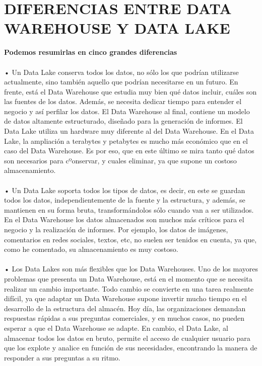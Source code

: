 \section{DIFERENCIAS ENTRE DATA WAREHOUSE Y DATA LAKE}
\item{
\textbf{Podemos resumirlas en cinco grandes diferencias}\\\\
•	Un Data Lake conserva todos los datos, no sólo los que podrían utilizarse actualmente, sino también aquello que podrían necesitarse en un futuro. En frente, está el Data Warehouse que estudia muy bien qué datos incluir, cuáles son las fuentes de los datos. Además, se necesita dedicar tiempo para entender el negocio y así perfilar los datos. El Data Warehouse al final, contiene un modelo de datos altamente estructurado, diseñado para la generación de informes. El Data Lake utiliza un hardware muy diferente al del Data Warehouse. En el Data Lake, la ampliación a terabytes y petabytes es mucho más económico que en el caso del Data Warehouse. Es por eso, que en este último se mira tanto qué datos son necesarios para cºonservar, y cuales eliminar, ya que supone un costoso almacenamiento.\\\\
•	Un Data Lake soporta todos los tipos de datos, es decir, en este se guardan todos los datos, independientemente de la fuente y la estructura, y además, se mantienen en su forma bruta, transformándolos sólo cuando van a ser utilizados. En el Data Warehouse los datos almacenados son muchos más críticos para el negocio y la realización de informes. Por ejemplo, los datos de imágenes, comentarios en redes sociales, textos, etc, no suelen ser tenidos en cuenta, ya que, como he comentado, su almacenamiento es muy costoso.\\\\
•	Los Data Lakes son más flexibles que los Data Warehouses. Uno de los mayores problemas que presenta un Data Warehouse, está en el momento que se necesita realizar un cambio importante. Todo cambio se convierte en una tarea realmente difícil, ya que adaptar un Data Warehouse supone invertir mucho tiempo en el desarrollo de la estructura del almacén. Hoy día, las organizaciones demandan respuestas rápidas a sus preguntas comerciales, y en muchos casos, no pueden esperar a que el Data Warehouse se adapte. En cambio, el Data Lake, al almacenar todos los datos en bruto, permite el acceso de cualquier usuario para que los explote y analice en función de sus necesidades, encontrando la manera de responder a sus preguntas a su ritmo.\\\\
}
